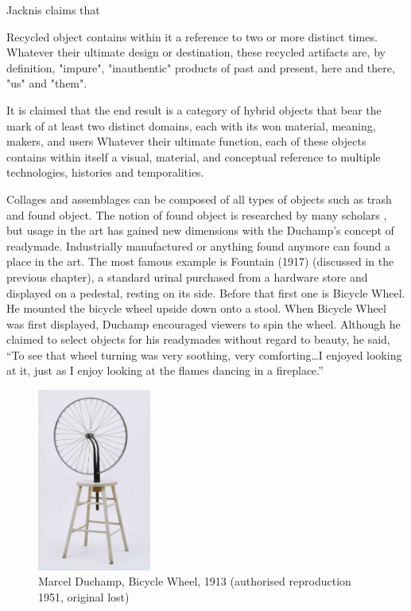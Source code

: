 Jacknis claims that  \citep[as cited in][]{cerny1996recycled}

Recycled object contains within it a reference to two or more distinct times. Whatever their ultimate design or destination, these recycled artifacts are, by definition, "impure", "inauthentic" products of past and present, here and there, "us" and "them". 

It is claimed that the end result is a category of hybrid objects that bear the mark of at least two distinct domains, each with its won material, meaning, makers, and users \citep{cerny1996recycled} Whatever their ultimate function, each of these objects contains within itself a visual, material, and conceptual reference to multiple technologies, histories and temporalities.

Collages and assemblages can be composed of all types of objects such as trash and found object. The notion of found object is researched by many scholars 
, but usage in the art has gained new dimensions with the Duchamp's concept of readymade. Industrially manufactured or anything found  anymore can found a place in the art. The most famous example is Fountain (1917) (discussed in the previous chapter), a standard urinal purchased from a hardware store and displayed on a pedestal, resting on its side. Before that first one is Bicycle Wheel. He mounted the bicycle wheel upside down onto a stool. 
When Bicycle Wheel was first displayed, Duchamp encouraged viewers to spin the wheel. Although he claimed to select objects for his readymades without regard to beauty, he said, “To see that wheel turning was very soothing, very comforting\ldots I enjoyed looking at it, just as I enjoy looking at the flames dancing in a fireplace.”

\begin{figure}[h!]
  \centering
  \includegraphics[height=6cm]{graphics/duchamp-bicycle-wheel-1913.jpg}
  \caption{Marcel Duchamp, Bicycle Wheel, 1913 (authorised reproduction 1951, original lost)}
  \label{fig:Duchamp_BicycleWheel}
\end{figure}





